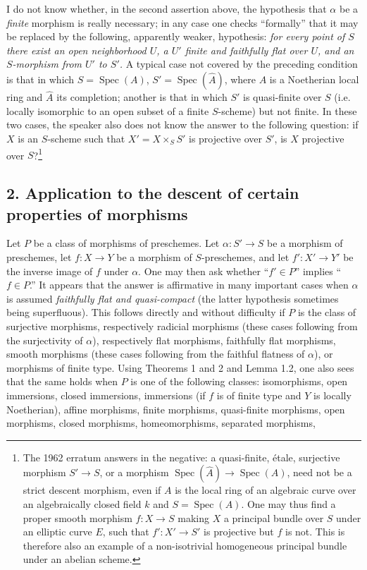  I do not know whether, in the second assertion above, the
hypothesis that $\alpha$ be a \emph{finite} morphism is really necessary; in
any case one checks “formally” that it may be replaced by the following,
apparently weaker, hypothesis: \emph{for every point of $S$ there exist an open
neighborhood $U$, a $U'$ finite and faithfully flat over $U$, and an
$S$-morphism from $U'$ to $S'$.} A typical case not covered by the preceding
condition is that in which $S=\operatorname{Spec}(A)$,
$S'=\operatorname{Spec}(\widehat A)$, where $A$ is a Noetherian local ring and
$\widehat A$ its completion; another is that in which $S'$ is quasi-finite over
$S$ (i.e. locally isomorphic to an open subset of a finite $S$-scheme) but not
finite. In these two cases, the speaker also does not know the answer to the
following question: if $X$ is an $S$-scheme such that $X'=X\times_SS'$ is
projective over $S'$, is $X$ projective over $S$?\footnote{The 1962 erratum
answers in the negative: a quasi-finite, étale, surjective morphism
$S'\longrightarrow S$, or a morphism
$\operatorname{Spec}(\widehat A)\longrightarrow\operatorname{Spec}(A)$, need
not be a strict descent morphism, even if $A$ is the local ring of an algebraic
curve over an algebraically closed field $k$ and $S=\operatorname{Spec}(A)$.
One may thus find a proper smooth morphism $f:X\longrightarrow S$ making $X$ a
principal bundle over $S$ under an elliptic curve $E$, such that
$f':X'\longrightarrow S'$ is projective but $f$ is not. This is therefore also
an example of a non-isotrivial homogeneous principal bundle under an abelian
scheme.}

\subsection*{2. Application to the descent of certain properties of morphisms}

Let $P$ be a class of morphisms of preschemes. Let
$\alpha:S'\longrightarrow S$ be a morphism of preschemes, let
$f:X\longrightarrow Y$ be a morphism of $S$-preschemes, and let
$f':X'\longrightarrow Y'$ be the inverse image of $f$ under $\alpha$. One may
then ask whether “$f'\in P$” implies “$f\in P$.” It appears that the answer is
affirmative in many important cases when $\alpha$ is assumed \emph{faithfully
flat and quasi-compact} (the latter hypothesis sometimes being superfluous).
This follows directly and without difficulty if $P$ is the class of
surjective morphisms, respectively radicial morphisms (these cases following
from the surjectivity of $\alpha$), respectively flat morphisms, faithfully
flat morphisms, smooth morphisms (these cases following from the faithful
flatness of $\alpha$), or morphisms of finite type. Using Theorems 1 and 2 and
Lemma 1.2, one also sees that the same holds when $P$ is one of the following
classes: isomorphisms, open immersions, closed immersions, immersions (if $f$ is
of finite type and $Y$ is locally Noetherian), affine morphisms, finite
morphisms, quasi-finite morphisms, open morphisms, closed morphisms,
homeomorphisms, separated morphisms,

